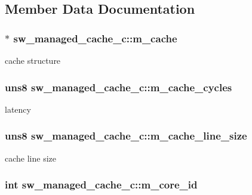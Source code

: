 \subsection{Member Data Documentation}
\hypertarget{classsw__managed__cache__c_a8eb9de675a6e89d05e03aba40c75e25e}{
\subsubsection[{m\_\-cache}]{$\ast$ {\bf sw\_\-managed\_\-cache\_\-c::m\_\-cache}}}
\label{classsw__managed__cache__c_a8eb9de675a6e89d05e03aba40c75e25e}
cache structure \hypertarget{classsw__managed__cache__c_a401a29b76dc159085a9fb16674b322de}{
\subsubsection[{m\_\-cache\_\-cycles}]{\setlength{\rightskip}{0pt plus 5cm}uns8 {\bf sw\_\-managed\_\-cache\_\-c::m\_\-cache\_\-cycles}}}
\label{classsw__managed__cache__c_a401a29b76dc159085a9fb16674b322de}
latency \hypertarget{classsw__managed__cache__c_a45f020073ac71e117fc186033f5aa0fa}{
\subsubsection[{m\_\-cache\_\-line\_\-size}]{\setlength{\rightskip}{0pt plus 5cm}uns8 {\bf sw\_\-managed\_\-cache\_\-c::m\_\-cache\_\-line\_\-size}}}
\label{classsw__managed__cache__c_a45f020073ac71e117fc186033f5aa0fa}
cache line size \hypertarget{classsw__managed__cache__c_a8151061bd7add9729c93ce0d03148ed6}{
\subsubsection[{m\_\-core\_\-id}]{\setlength{\rightskip}{0pt plus 5cm}int {\bf sw\_\-managed\_\-cache\_\-c::m\_\-core\_\-id}}}
